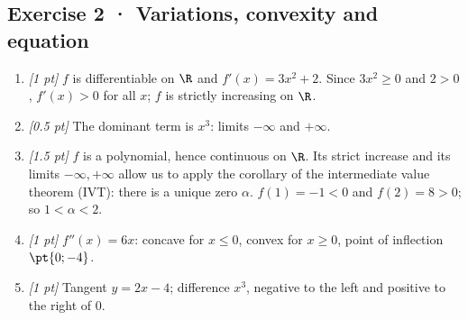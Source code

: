 \subsection*{Exercise 2 · Variations, convexity and equation}\begin{enumerate}

\item \textit{[1 pt]} $f$ is differentiable on $\R$ and $f'(x)=3x^2+2$. Since $3x^2\ge0$ and $2>0$, $f'(x)>0$ for all $x$; $f$ is strictly increasing on $\R$.

\item \textit{[0.5 pt]} The dominant term is $x^3$: limits $-\infty$ and $+\infty$.

\item \textit{[1.5 pt]} $f$ is a polynomial, hence continuous on $\R$. Its strict increase and its limits $-\infty,+\infty$ allow us to apply the corollary of the intermediate value theorem (IVT): there is a unique zero $\alpha$. $f(1)=-1<0$ and $f(2)=8>0$; so $1<\alpha<2$.

\item \textit{[1 pt]} $f''(x)=6x$: concave for $x\le0$, convex for $x\ge0$, point of inflection $\pt{0;-4}$.

\item \textit{[1 pt]} Tangent $y=2x-4$; difference $x^3$, negative to the left and positive to the right of $0$.

\end{enumerate}

